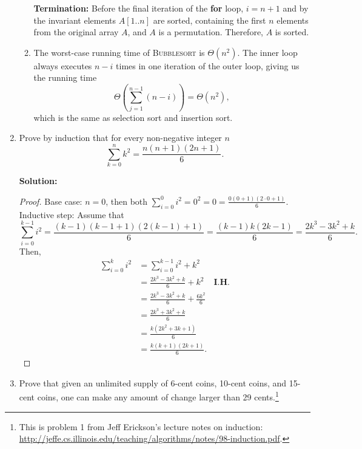 \documentclass[letterpaper,11pt]{article}
\begin{document}
\begin{enumerate}
\begin{enumerate}
\noindent\textbf{Termination:} Before the final iteration of the \textbf{for} loop, $i=n+1$ and by the invariant elements $A[1..n]$ are sorted, containing the first $n$ elements from the original array $A$, and $A$ is a permutation. Therefore, $A$ is sorted.\\

\newpage

\item The worst-case running time of \textsc{Bubblesort} is $\Theta(n^2)$. The inner loop always executes $n-i$ times in one iteration of the outer loop, giving us the running time
\[\Theta\left(\sum_{j=1}^{n-1}(n-i)\right) = \Theta(n^2),\]
which is the same as selection sort and insertion sort.

\end{enumerate}

\item Prove by induction that for every non-negative integer $n$
\[\sum_{k=0}^{n} k^2 = \frac{n(n+1)(2n+1)}{6}.\]

\noindent\textbf{Solution:}
\begin{proof}
Base case: $n=0$, then both $\sum_{i=0}^{0}i^2 = 0^2 = 0 = \frac{0(0+1)(2\cdot0 + 1)}{6}$.\\

Inductive step: Assume that \[\sum_{i=0}^{k-1}i^2 = \frac{(k-1)(k-1+1)(2(k-1) + 1)}{6} = \frac{(k-1)k(2k-1)}{6} = \frac{2k^3 - 3k^2 + k}{6}.\] Then,
\begin{align*}
\sum_{i=0}^{k}i^2 &= \sum_{i=0}^{k-1}i^2 + k^2\\
                  &= \frac{2k^3 -3k^2 + k}{6} + k^2&\textbf{I.H.}\\
                  &= \frac{2k^3 -3k^2 + k}{6} + \frac{6k^2}{6}\\
                  &= \frac{2k^3 +3k^2 + k}{6}\\
                  &= \frac{k(2k^2 + 3k + 1)}{6}\\
                  &= \frac{k(k+1)(2k+1)}{6}.
\end{align*}
\end{proof}

\newpage

\item Prove that given an unlimited supply of 6-cent coins, 10-cent coins, and 15-cent coins, one can make any amount of change larger than 29 cents.\footnote{This is problem 1 from Jeff Erickson's lecture notes on induction: \url{http://jeffe.cs.illinois.edu/teaching/algorithms/notes/98-induction.pdf}.}\\


\end{enumerate}
\end{document}
